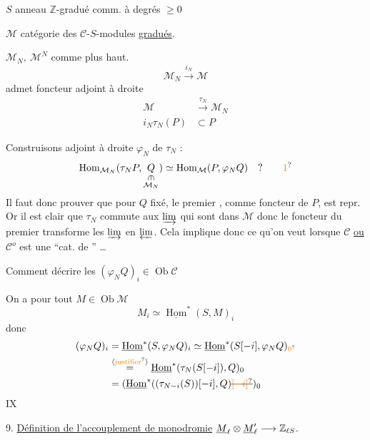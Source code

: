 $S$ anneau $\mathbb Z$-gradué comm. à degrés $\geq0$

$\mathcal M$ catégorie des $\mathcal C$-$S$-modules \uline{gradués}.

$\mathcal M_N,\ \mathcal M^N$  comme plus haut.
\[
\mathcal M_N\xrightarrow{i_N}\mathcal M
\]
admet foncteur adjoint à droite
\[
\begin{aligned}
\mathcal M&\xrightarrow{\tau_N}\mathcal M_N\\
i_N\tau_N(P)&\subset P
\end{aligned}
\]

Construisons adjoint à droite $\varphi_N$ de $\tau_N$ :
\[
\operatorname{Hom}_{\mathcal M_N}(\tau_N P,\underset{\substack{\rotatebox{-90}{$\in$}\\\mathcal M_N}}{Q})\simeq
\operatorname{Hom}_{\mathcal M}(P,\varphi_N Q)\quad ?\tag*{\unsure{1}}
\]
Il faut donc prouver que pour $Q$ fixé, le premier , comme foncteur de $P$, est repr. Or il est clair que $\tau_N$ commute aux $\varinjlim$ qui sont  dans $\mathcal M$ donc le foncteur du premier  transforme les $\varinjlim$ en $\varprojlim$. Cela implique donc ce qu'on veut lorsque $\mathcal C$ \uline{ou} $\mathcal C^{o}$ est une ``cat. de '' \ldots

Comment  décrire les $(\varphi_N Q)_i\in\operatorname{Ob}\mathcal C$

On a pour \deleted{\unsure{$\varphi$}} tout $M\in\operatorname{Ob}\mathcal M$
\[
M_i\simeq\underline{\operatorname{Hom}}^{*}(S,M)_i
\]
donc
\[
\begin{aligned}
(\varphi_N Q)_i&=\underline{\operatorname{Hom}}^{*}(S,\varphi_N Q)_i\simeq\underline{\operatorname{Hom}}^{*}(S[-i],\varphi_N Q)_{\unsure{0}}\\
&\overset{\text{\inserted{\unsure{justifier}}}}{=}\underline{\operatorname{Hom}}^{*}(\tau_N(S[-i]),Q)_0\\
&=(\underline{\operatorname{Hom}}^{*}((\tau_{N-i}(S))[-i],Q)\deleted{\unsure{[-i]}})_0
\end{aligned}
\]
\hfill IX

9. \uline{Définition de l'accouplement de monodromie} $\underline M_{\ell}\otimes\underline M'_{\ell}\longrightarrow\mathbb Z_{\ell S}$.

